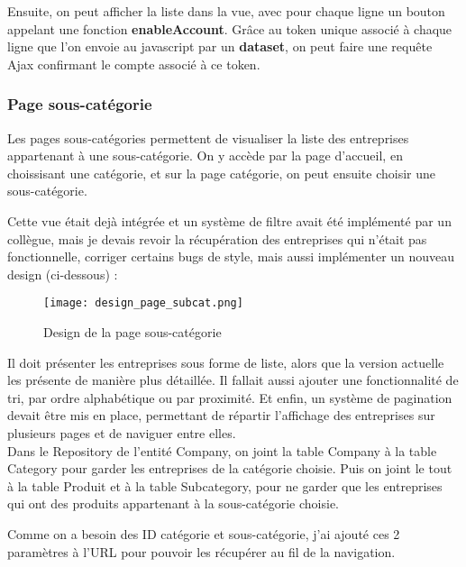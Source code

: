 Ensuite, on peut afficher la liste dans la vue, avec pour chaque ligne un bouton appelant une fonction \textbf{enableAccount}. 
Grâce au token unique associé à chaque ligne que l'on envoie au javascript par un \textbf{dataset}, on peut faire une requête Ajax confirmant le compte associé à ce token.


\subsubsection{Page sous-catégorie}



Les pages sous-catégories permettent de visualiser la liste des entreprises appartenant à une sous-catégorie. 
On y accède par la page d'accueil, en choissisant une catégorie, et sur la page catégorie, on peut ensuite choisir une sous-catégorie.

Cette vue était dejà intégrée et un système de filtre avait été implémenté par un collègue, mais je devais revoir la récupération des entreprises qui n'était pas fonctionnelle, corriger certains bugs de style, mais aussi implémenter un nouveau design (ci-dessous) :

\begin{figure}[H]
    \texttt{[image: design\_page\_subcat.png]}
    \caption{Design de la page sous-catégorie}
\end{figure}

Il doit présenter les entreprises sous forme de liste, alors que la version actuelle les présente de manière plus détaillée. 
Il fallait aussi ajouter une fonctionnalité de tri, par ordre alphabétique ou par proximité.
Et enfin, un système de pagination devait être mis en place, permettant de répartir l'affichage des entreprises sur plusieurs pages et de naviguer entre elles.\\

Dans le Repository de l'entité Company, on joint la table Company à la table Category pour garder les entreprises de la catégorie choisie.
Puis on joint le tout à la table Produit et à la table Subcategory, pour ne garder que les entreprises qui ont des produits appartenant à la sous-catégorie choisie.

Comme on a besoin des ID catégorie et sous-catégorie, j'ai ajouté ces 2 paramètres à l'URL pour pouvoir les récupérer au fil de la navigation.

